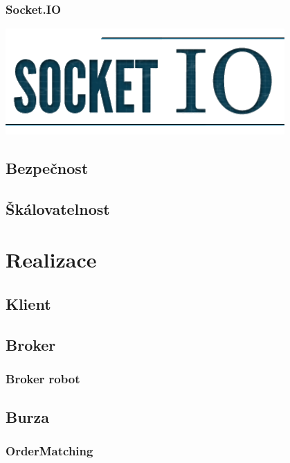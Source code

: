 \documentclass[thesis=M,czech]{FITthesis}[2012/06/26]
\begin{document}
\subsection{Socket.IO}

\includegraphics[width=0.8\textwidth]{images/logo_socketio}

\section{Bezpečnost}
\section{Škálovatelnost}


\chapter{Realizace}

\section{Klient}
\section{Broker}
\subsection{Broker robot}
\section{Burza}
\subsection{OrderMatching}

\end{document}
